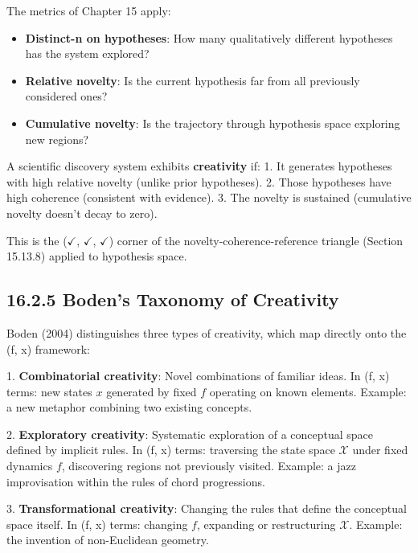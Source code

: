 The metrics of Chapter 15 apply:

\begin{itemize}
\item \textbf{Distinct-n on hypotheses}: How many qualitatively different hypotheses has the system explored?
\item \textbf{Relative novelty}: Is the current hypothesis far from all previously considered ones?
\item \textbf{Cumulative novelty}: Is the trajectory through hypothesis space exploring new regions?
\end{itemize}

\begin{definition}
A scientific discovery system exhibits \textbf{creativity} if:
1. It generates hypotheses with high relative novelty (unlike prior hypotheses).
2. Those hypotheses have high coherence (consistent with evidence).
3. The novelty is sustained (cumulative novelty doesn't decay to zero).

This is the ($\checkmark$, $\checkmark$, $\checkmark$) corner of the novelty-coherence-reference triangle (Section 15.13.8) applied to hypothesis space.
\end{definition}

\subsection{16.2.5 Boden's Taxonomy of Creativity}

Boden (2004) distinguishes three types of creativity, which map directly onto the (f, x) framework:

\begin{definition}

1. \textbf{Combinatorial creativity}: Novel combinations of familiar ideas. In (f, x) terms: new states $x$ generated by fixed $f$ operating on known elements. Example: a new metaphor combining two existing concepts.

2. \textbf{Exploratory creativity}: Systematic exploration of a conceptual space defined by implicit rules. In (f, x) terms: traversing the state space $\mathcal{X}$ under fixed dynamics $f$, discovering regions not previously visited. Example: a jazz improvisation within the rules of chord progressions.

3. \textbf{Transformational creativity}: Changing the rules that define the conceptual space itself. In (f, x) terms: changing $f$, expanding or restructuring $\mathcal{X}$. Example: the invention of non-Euclidean geometry.
\end{definition}

